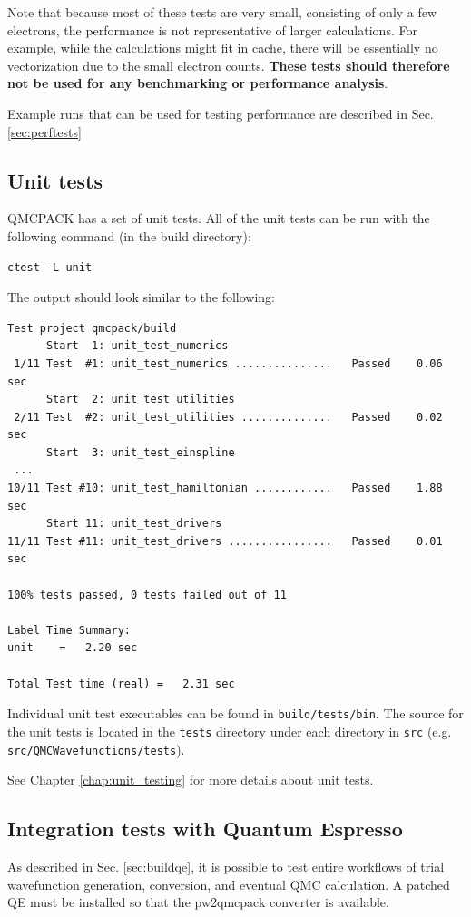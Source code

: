 Note that because most of these tests are very small, consisting of only a few
electrons, the performance is not representative of larger
calculations. For example, while the calculations might fit in cache,
there will be essentially no vectorization due to the small electron
counts. \textbf{These tests should therefore not be used for any benchmarking or
performance analysis}.

Example runs that can be used for testing performance are described in
Sec. \ref{sec:perftests}

\subsection{Unit tests}

QMCPACK has a set of unit tests.
All of the unit tests can be run with the following command (in the build directory):
\begin{verbatim}
ctest -L unit
\end{verbatim}

The output should look similar to the following:
\begin{verbatim}
Test project qmcpack/build
      Start  1: unit_test_numerics
 1/11 Test  #1: unit_test_numerics ...............   Passed    0.06 sec
      Start  2: unit_test_utilities
 2/11 Test  #2: unit_test_utilities ..............   Passed    0.02 sec
      Start  3: unit_test_einspline
 ...
10/11 Test #10: unit_test_hamiltonian ............   Passed    1.88 sec
      Start 11: unit_test_drivers
11/11 Test #11: unit_test_drivers ................   Passed    0.01 sec

100% tests passed, 0 tests failed out of 11

Label Time Summary:
unit    =   2.20 sec

Total Test time (real) =   2.31 sec
\end{verbatim}

Individual unit test executables can be found in \texttt{build/tests/bin}.
The source for the unit tests is located in the \texttt{tests} directory under each directory in \texttt{src} (e.g. \texttt{src/QMCWavefunctions/tests}).

See Chapter \ref{chap:unit_testing} for more details about unit tests.

\subsection{Integration tests with Quantum Espresso}
\label{sec:integtestqe}
As described in Sec. \ref{sec:buildqe}, it is possible to test entire
workflows of trial wavefunction generation, conversion, and eventual
QMC calculation. A patched QE must be installed so that the
pw2qmcpack converter is available.

